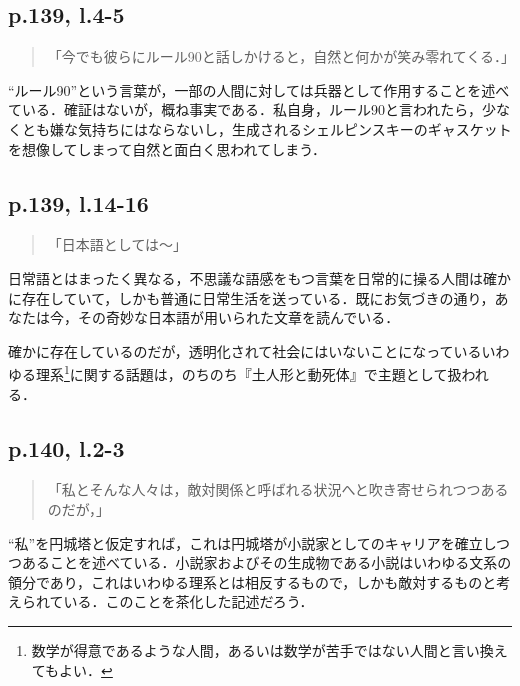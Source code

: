 \documentclass[10pt, a5paper, twoside]{ltjsarticle}
\begin{document}
        \subsection{p.139, l.4-5}

            \begin{quote}
                「今でも彼らにルール90と話しかけると，自然と何かが笑み零れてくる．」
            \end{quote}

            “ルール90”という言葉が，一部の人間に対しては兵器として作用することを述べている．確証はないが，概ね事実である．私自身，ルール90と言われたら，少なくとも嫌な気持ちにはならないし，生成されるシェルピンスキーのギャスケットを想像してしまって自然と面白く思われてしまう．

        \subsection{p.139, l.14-16}

            \begin{quote}
                「日本語としては〜」
            \end{quote}

            日常語とはまったく異なる，不思議な語感をもつ言葉を日常的に操る人間は確かに存在していて，しかも普通に日常生活を送っている．既にお気づきの通り，あなたは今，その奇妙な日本語が用いられた文章を読んでいる．

            確かに存在しているのだが，透明化されて社会にはいないことになっているいわゆる理系\footnote{数学が得意であるような人間，あるいは数学が苦手ではない人間と言い換えてもよい．}に関する話題は，のちのち『土人形と動死体』で主題として扱われる．

        \subsection{p.140, l.2-3}

            \begin{quote}
                「私とそんな人々は，敵対関係と呼ばれる状況へと吹き寄せられつつあるのだが，」
            \end{quote}

            “私”を円城塔と仮定すれば，これは円城塔が小説家としてのキャリアを確立しつつあることを述べている．小説家およびその生成物である小説はいわゆる文系の領分であり，これはいわゆる理系とは相反するもので，しかも敵対するものと考えられている．このことを茶化した記述だろう．
\end{document}
